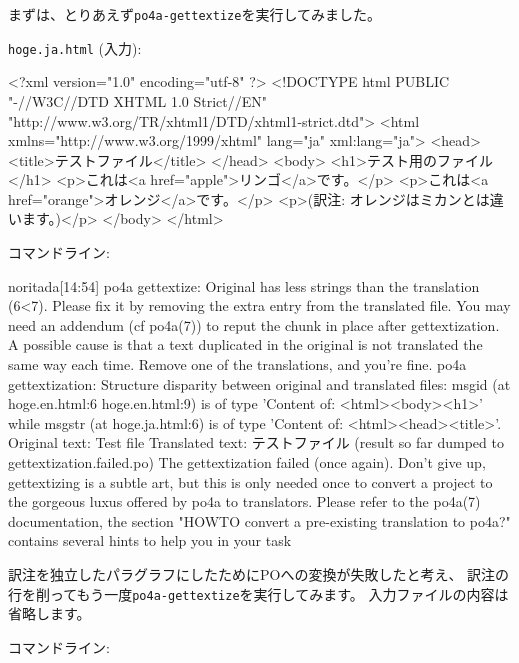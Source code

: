 \documentclass[mingoth,a4paper]{jsarticle}
\begin{document}
まずは、とりあえず\texttt{po4a-gettextize}を実行してみました。

\texttt{hoge.ja.html} (入力):

\begin{commandline}
<?xml version="1.0" encoding="utf-8" ?>
<!DOCTYPE html PUBLIC "-//W3C//DTD XHTML 1.0 Strict//EN"
"http://www.w3.org/TR/xhtml1/DTD/xhtml1-strict.dtd">
<html xmlns="http://www.w3.org/1999/xhtml" lang="ja" xml:lang="ja">
<head>
<title>テストファイル</title>
</head>
<body>
<h1>テスト用のファイル</h1>
<p>これは<a href="apple">リンゴ</a>です。</p>
<p>これは<a href="orange">オレンジ</a>です。</p>
<p>(訳注: オレンジはミカンとは違います。)</p>
</body>
</html>
\end{commandline}

コマンドライン:

\begin{commandline}
noritada[14:54]%
po4a gettextize: Original has less strings than the translation (6<7). Please 
               fix it by removing the extra entry from the translated file. You 
               may need an addendum (cf po4a(7)) to reput the chunk in place 
               after gettextization. A possible cause is that a text duplicated 
               in the original is not translated the same way each time. Remove 
               one of the translations, and you're fine.
po4a gettextization: Structure disparity between original and translated files:
msgid (at hoge.en.html:6 hoge.en.html:9) is of type 'Content of: 
<html><body><h1>' while
msgstr (at hoge.ja.html:6) is of type 'Content of: <html><head><title>'.
Original text: Test file
Translated text: テストファイル
(result so far dumped to gettextization.failed.po)
The gettextization failed (once again). Don't give up, gettextizing is a subtle 
art, but this is only needed once to convert a project to the gorgeous luxus 
offered by po4a to translators.
Please refer to the po4a(7) documentation, the section "HOWTO convert a 
pre-existing translation to po4a?" contains several hints to help you in your 
task
\end{commandline}

訳注を独立したパラグラフにしたためにPOへの変換が失敗したと考え、
訳注の行を削ってもう一度\texttt{po4a-gettextize}を実行してみます。
入力ファイルの内容は省略します。

コマンドライン:
\end{document}
